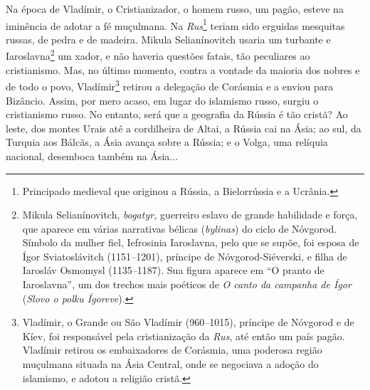 Na época de Vladímir, o Cristianizador, o homem russo, um pagão, esteve
na iminência de adotar a fé muçulmana. Na \emph{Rus}\footnote{Principado
  medieval que originou a Rússia, a Bielorrússia e a Ucrânia.} teriam
sido erguidas mesquitas russas, de pedra e de madeira. Mikula
Selianínovitch usaria um turbante e Iaroslavna\footnote{Mikula
  Selianínovitch, \emph{bogatyr,} guerreiro eslavo de grande habilidade
  e força, que aparece em várias narrativas bélicas (\emph{bylinas}) do
  ciclo de Nóvgorod. Símbolo da mulher fiel, Iefrosinia Iaroslavna, pelo
  que se supõe, foi esposa de Ígor Sviatoslávitch (1151\emph{--}1201),
  príncipe de Nóvgorod-Siéverski, e filha de Iarosláv Osmomysl
  (1135\emph{--}1187). Sua figura aparece em ``O pranto de Iaroslavna'',
  um dos trechos mais poéticos de \emph{O canto da campanha de Ígor}
  (\emph{Slovo o polku Ígoreve}).} um xador, e não haveria questões
fatais, tão peculiares ao cristianismo. Mas, no último momento, contra a
vontade da maioria dos nobres e de todo o povo, Vladímir\footnote{Vladímir,
  o Grande ou São Vladímir (960\emph{--}1015), príncipe de Nóvgorod e de
  Kíev, foi responsável pela cristianização da \emph{Rus}, até então um
  país pagão. Vladímir retirou os embaixadores de Corásmia, uma poderosa
  região muçulmana situada na Ásia Central, onde se negociava a adoção
  do islamismo, e adotou a religião cristã.} retirou a delegação de
Corásmia e a enviou para Bizâncio. Assim, por mero acaso, em lugar do
islamismo russo, surgiu o cristianismo russo. No entanto, será que a
geografia da Rússia é tão cristã? Ao leste, dos montes Urais até a
cordilheira de Altai, a Rússia cai na Ásia; ao sul, da Turquia aos
Bálcãs, a Ásia avança sobre a Rússia; e o Volga, uma relíquia nacional,
desemboca também na Ásia...

